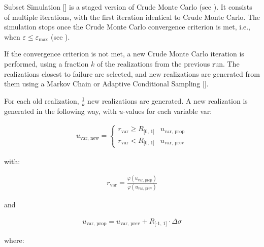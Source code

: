 {Subset Simulation [\cite{Au2001}] is a staged version of Crude Monte Carlo (see ). It consists of multiple iterations, with the first iteration identical to Crude Monte Carlo. The simulation stops once the Crude Monte Carlo convergence criterion is met, i.e., when $\varepsilon \leq \varepsilon_{\text{max}}$ (see ).

If the convergence criterion is not met, a new Crude Monte Carlo iteration is performed, using a fraction $k$ of the realizations from the previous run. The realizations closest to failure are selected, and new realizations are generated from them using a Markov Chain or Adaptive Conditional Sampling [\cite{PAPAIOANNOU201589}].

For each old realization, $\tfrac{1}{k}$ new realizations are generated. A new realization is generated in the following way, with $u$-values for each variable var:

\begin{align} 
\label{eq:SubsetSimulationMarkovChain}
u_{\text{var, new}} = \left\{\begin{array}{ll} r_{\text{var}} \geq R_{\text{[0, 1]}}  & u_{\text{var, prop}}\\
r_{\text{var}} < R_{\text{[0, 1]}}  & u_{\text{var, prev}}
\end{array}	
\right.
\end{align}

with:

\begin{align} 
\label{eq:SubsetSimulationRatio}
r_{\text{var}} = \frac{\varphi \left(u_{\text{var, prop}}\right)}{\varphi \left(u_{\text{var, prev}}\right)}
\end{align}

and

\begin{align} 
\label{eq:SubsetSimulationProposed}
u_{\text{var, prop}} = u_{\text{var, prev}} + R_{\text{[-1, 1]}} \cdot \Delta \sigma
\end{align}

where:

}
